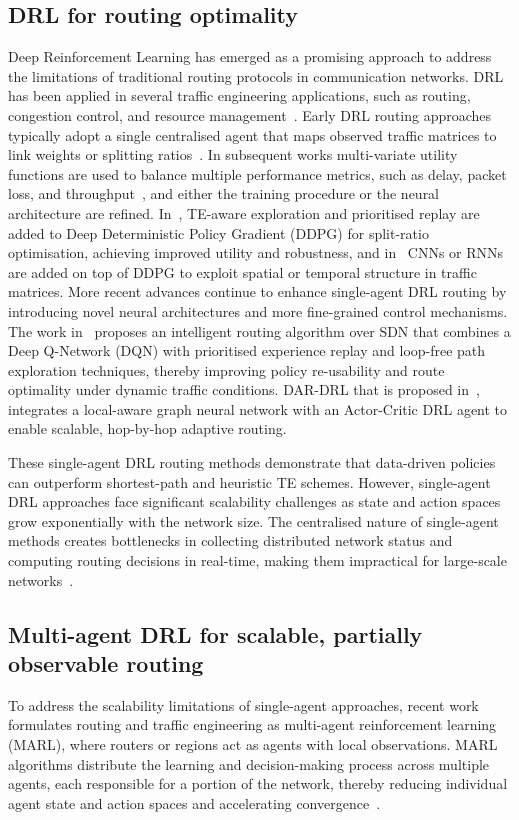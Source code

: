 \documentclass[10pt,journal,comsoc]{IEEEtran}
\begin{document}
\subsection{DRL for routing optimality}
Deep Reinforcement Learning has emerged as a promising approach to address the limitations of traditional routing protocols in communication networks. DRL has been applied in several traffic engineering applications, such as routing, congestion control, and resource management~\cite{xiao2021leveraging,prakash2023survey}. Early DRL routing approaches typically adopt a single centralised agent that maps observed traffic matrices to link weights or splitting ratios~\cite{stampa2017deep}. In subsequent works multi-variate utility functions are used to balance multiple performance metrics, such as delay, packet loss, and throughput~\cite{xiao2021leveraging,yu2018drom}, and either the training procedure or the neural architecture are refined. In~\cite{xu2018experience}, TE-aware exploration and prioritised replay are added to Deep Deterministic Policy Gradient (DDPG) for split-ratio optimisation, achieving improved utility and robustness, and in~\cite{8780950} CNNs or RNNs are added on top of DDPG to exploit spatial or temporal structure in traffic matrices. More recent advances continue to enhance single-agent DRL routing by introducing novel neural architectures and more fine-grained control mechanisms. The work in~\cite{huang2024intelligent} proposes an intelligent routing algorithm over SDN that combines a Deep Q-Network (DQN) with prioritised experience replay and loop-free path exploration techniques, thereby improving policy re-usability and route optimality under dynamic traffic conditions. DAR-DRL that is proposed in~\cite{rao2024dar}, integrates a local-aware graph neural network with an Actor-Critic DRL agent to enable scalable, hop-by-hop adaptive routing.

These single-agent DRL routing methods demonstrate that data-driven policies can outperform shortest-path and heuristic TE schemes. However, single-agent DRL approaches face significant scalability challenges as state and action spaces grow exponentially with the network size. The centralised nature of single-agent methods creates bottlenecks in collecting distributed network status and computing routing decisions in real-time, making them impractical for large-scale networks~\cite{feriani2021single,geng2020multi,guo2024distributed}.

\subsection{Multi-agent DRL for scalable, partially observable routing}
To address the scalability limitations of single-agent approaches, recent work formulates routing and traffic engineering as multi-agent reinforcement learning (MARL), where routers or regions act as agents with local observations. MARL algorithms distribute the learning and decision-making process across multiple agents, each responsible for a portion of the network, thereby reducing individual agent state and action spaces and accelerating convergence~\cite{xiao2021leveraging,feriani2021single}.
\end{document}
